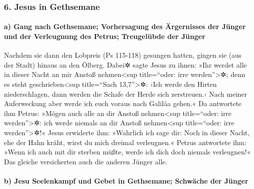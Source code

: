 \hypertarget{jesus-in-gethsemane}{%
\subsubsection{6. Jesus in Gethsemane}\label{jesus-in-gethsemane}}

\hypertarget{a-gang-nach-gethsemane-vorhersagung-des-uxe4rgernisses-der-juxfcnger-und-der-verleugnung-des-petrus-treugeluxfcbde-der-juxfcnger}{%
\paragraph{a) Gang nach Gethsemane; Vorhersagung des Ärgernisses der
Jünger und der Verleugnung des Petrus; Treugelübde der
Jünger}\label{a-gang-nach-gethsemane-vorhersagung-des-uxe4rgernisses-der-juxfcnger-und-der-verleugnung-des-petrus-treugeluxfcbde-der-juxfcnger}}

 Nachdem sie dann den Lobpreis (Ps 115-118) gesungen
hatten, gingen sie (aus der Stadt) hinaus an den Ölberg. 
Dabei✲ sagte Jesus zu ihnen: »Ihr werdet alle in dieser Nacht an mir
Anstoß nehmen\textless sup title=``oder: irre werden''\textgreater✲;
denn es steht geschrieben\textless sup title=``Sach 13,7''\textgreater✲:
›Ich werde den Hirten niederschlagen, dann werden die Schafe der Herde
sich zerstreuen.‹  Nach meiner Auferweckung aber werde
ich euch voraus nach Galiläa gehen.«  Da antwortete ihm
Petrus: »Mögen auch alle an dir Anstoß nehmen\textless sup title=``oder:
irre werden''\textgreater✲: ich werde niemals an dir Anstoß
nehmen\textless sup title=``oder: irre werden''\textgreater✲!«
 Jesus erwiderte ihm: »Wahrlich ich sage dir: Noch in
dieser Nacht, ehe der Hahn kräht, wirst du mich dreimal verleugnen.«
 Petrus antwortete ihm: »Wenn ich auch mit dir sterben
müßte, werde ich dich doch niemals verleugnen!« Das gleiche versicherten
auch die anderen Jünger alle.

\hypertarget{b-jesu-seelenkampf-und-gebet-in-gethsemane-schwuxe4che-der-juxfcnger}{%
\paragraph{b) Jesu Seelenkampf und Gebet in Gethsemane; Schwäche der
Jünger}\label{b-jesu-seelenkampf-und-gebet-in-gethsemane-schwuxe4che-der-juxfcnger}}

